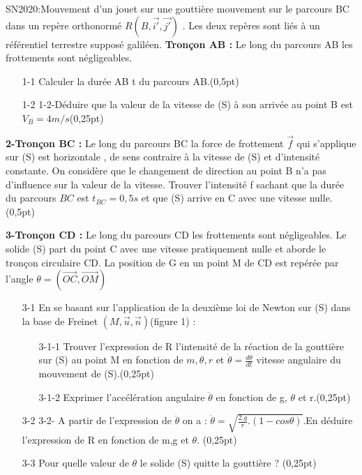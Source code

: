 \documentclass[12pt]{article}
\begin{document}
\begin{Box2}{SN2020:Mouvement d’un jouet sur une gouttière}
  mouvement sur le parcours BC dans un repère orthonormé $R(B,\vec{i'}, \vec{j'})$
. Les deux repères sont liés à un
référentiel terrestre supposé galiléen.
  \textbf{Tronçon AB :}
  Le long du parcours AB les frottements sont
négligeables.

\begin{enumerate}
  \item[1-1] Calculer la durée AB t du parcours AB.(0,5pt) 
  \item[1-2]1-2-Déduire que la valeur de la vitesse de (S) à son
arrivée au point B est $V_B = 4 m/s$(0,25pt)
\end{enumerate}

  \textbf{2-Tronçon BC :}
Le long du parcours BC la force de frottement $\vec{f}$
qui s’applique sur (S) est horizontale , de sens contraire à la vitesse de (S) et d’intensité constante.
On considère que le changement de direction au point B n’a pas d’influence sur la valeur de la vitesse.
  Trouver l’intensité f sachant que la durée du parcours $BC$ est $t_{BC} = 0,5s$ et que (S) arrive en C avec une
vitesse nulle.(0,5pt)

  \textbf{3-Tronçon CD :}
Le long du parcours CD les frottements sont négligeables. Le solide (S) part du point C avec une vitesse pratiquement
nulle et aborde le tronçon circulaire CD. La position de G en un point M de CD est repérée par l’angle $\theta = (\vec{OC}, \vec{OM})$

\begin{enumerate}
  \item[3-1] En se basant sur l’application de la deuxième loi de Newton sur (S) dans la base de Freinet $(M, \vec{u}, \vec{n})$(figure 1) :
    \begin{enumerate}
      \item[3-1-1] Trouver l’expression de R l’intensité de la réaction de la gouttière sur (S) au point M en fonction de $m,\theta, r$ et $\dot{\theta} = \frac{d\theta}{dt}$ vitesse angulaire du mouvement de (S).(0,25pt)
      \item[3-1-2] Exprimer l’accélération angulaire $\ddot{\theta}$ en fonction de g, $\theta$ et r.(0,25pt)
    \end{enumerate}
  \item[3-2] 3-2- A partir de l’expression de $\ddot{\theta}$ on a : $\dot{\theta} = \sqrt{\frac{2.g}{r}.(1-cos\theta)}$.En déduire l’expression de R en fonction de
m,g et $\theta$. (0,25pt)
\item[3-3] Pour quelle valeur de $\theta$ le solide (S) quitte la gouttière ? (0,25pt)
\end{enumerate}
\end{Box2}
\end{document}

